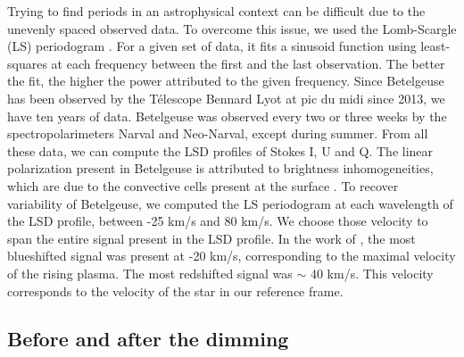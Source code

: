 \documentclass{aa}
\begin{document}
Trying to find periods in an astrophysical context can be difficult due to the unevenly spaced observed data. To overcome this issue, 
we used the Lomb-Scargle (LS) periodogram \citep{lomb_least-squares_1976,scargle_studies_1982}. For a given set of data, it fits a sinusoid function using least-squares at each 
frequency between the first and the last observation. The better the fit, the higher the power attributed to the given frequency. Since Betelgeuse has 
been observed by the Télescope Bennard Lyot at pic du midi since 2013, we have ten years of data. Betelgeuse was observed every two or three weeks by 
the spectropolarimeters Narval and Neo-Narval, except during summer. From all these data, we can compute the LSD profiles of Stokes I, U and Q. The linear polarization present in Betelgeuse is attributed to brightness 
inhomogeneities, which are due to the convective cells present at the surface \citep{lopez_ariste_convective_2018}. To recover variability of Betelgeuse, 
we computed the LS periodogram at each wavelength of the LSD profile, between -25 km/s and 80 km/s. We choose those velocity to span the entire 
signal present in the LSD profile. In the work of \cite{lopez_ariste_convective_2018}, the most blueshifted signal was present at -20 km/s, 
corresponding to the maximal velocity of the rising plasma. The most redshifted signal was $\sim$ 40 km/s. This velocity corresponds 
to the velocity of the star in our reference frame. 


\subsection{Before and after the dimming}
\end{document}
